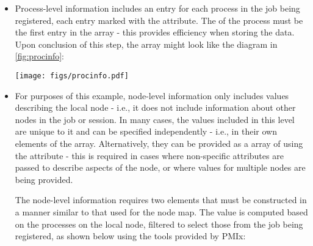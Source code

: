 \begin{itemize}
Upon conclusion of this step, the  array might look like that shown in \ref{fig:appinfo}, assuming there are two applications in the job being registered:

\begingroup
\begin{figure*}[ht!]
  \begin{center}
    \texttt{[image: figs/appinfo.pdf]}
  \end{center}
  \caption{Application-level information elements}
  \label{fig:appinfo}
\end{figure*}
\endgroup

\item Process-level information includes an entry for each process in the job being registered, each entry marked with the  attribute. The  of the process must be the first entry in the array - this provides efficiency when storing the data. Upon conclusion of this step, the  array might look like the diagram in \ref{fig:procinfo}:

\begingroup
\begin{figure*}[ht!]
  \begin{center}
    \texttt{[image: figs/procinfo.pdf]}
  \end{center}
  \caption{Process-level information elements}
  \label{fig:procinfo}
\end{figure*}
\endgroup

\item For purposes of this example, node-level information only includes values describing the local node - i.e., it does not include information about other nodes in the job or session. In many cases, the values included in this level are unique to it and can be specified independently - i.e., in their own  elements of the  array. Alternatively, they can be provided as a  array of  using the  attribute - this is required in cases where non-specific attributes are passed to describe aspects of the node, or where values for multiple nodes are being provided.

The node-level information requires two elements that must be constructed in a manner similar to that used for the node map. The  value is computed based on the processes on the local node, filtered to select those from the job being registered, as shown below using the tools provided by \ac{PMIx}:


\end{itemize}
